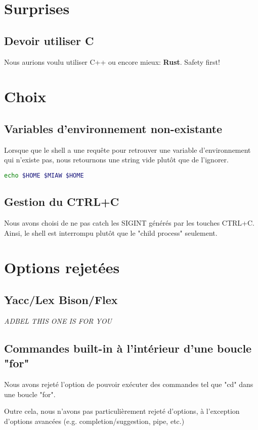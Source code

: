 \documentclass[a4paper]{article}
\begin{document}
\section*{Surprises}
    \subsection*{Devoir utiliser C}
    Nous aurions voulu utiliser C++ ou encore mieux: {\bf Rust}. Safety first!

\section*{Choix}
    \subsection*{Variables d'environnement non-existante}
    Lorsque que le shell a une requ\^ete pour retrouver une variable
    d'environnement qui n'existe pas, nous retournons une string vide plut\^ot
    que de l'ignorer.
        \begin{lstlisting}[language=bash]
echo $HOME $MIAW $HOME
        \end{lstlisting}

    \subsection*{Gestion du CTRL+C}
        Nous avons choisi de ne pas catch les SIGINT g\'en\'er\'es par les touches CTRL+C. Ainsi, le shell est 
        interrompu plut\^ot que le "child process" seulement.

\section*{Options rejet\'ees}
    \subsection*{Yacc/Lex Bison/Flex}
    {\it ADBEL THIS ONE IS FOR YOU}

    \subsection*{Commandes built-in \`a l'int\'erieur d'une boucle "for"}
    Nous avons rejet\'e l'option de pouvoir ex\'ecuter des commandes tel que "cd" dans une boucle "for".
    \break

    Outre cela, nous n'avons pas particuli\`erement rejet\'e d'options, \`a
    l'exception d'options avanc\'ees (e.g. completion/suggestion, pipe, etc.)
\end{document}
